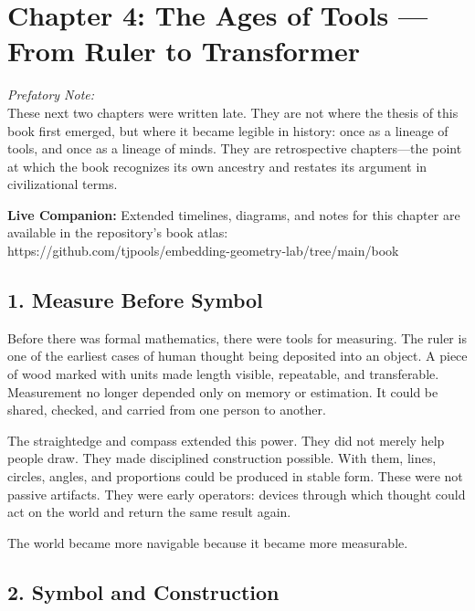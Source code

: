 \newpage
\vspace*{3cm}

\hypertarget{chapter-4-the-ages-of-tools-from-ruler-to-transformer}{%
\section{Chapter 4: The Ages of Tools --- From Ruler to
Transformer}\label{chapter-4-the-ages-of-tools-from-ruler-to-transformer}}

\emph{Prefatory Note:}\\
These next two chapters were written late. They are not where the thesis
of this book first emerged, but where it became legible in history: once
as a lineage of tools, and once as a lineage of minds. They are
retrospective chapters---the point at which the book recognizes its own
ancestry and restates its argument in civilizational terms.

\textbf{Live Companion:} Extended timelines, diagrams, and notes for
this chapter are available in the repository's book atlas:\\
https://github.com/tjpools/embedding-geometry-lab/tree/main/book

\hypertarget{measure-before-symbol}{%
\subsection{1. Measure Before Symbol}\label{measure-before-symbol}}

Before there was formal mathematics, there were tools for measuring. The
ruler is one of the earliest cases of human thought being deposited into
an object. A piece of wood marked with units made length visible,
repeatable, and transferable. Measurement no longer depended only on
memory or estimation. It could be shared, checked, and carried from one
person to another.

The straightedge and compass extended this power. They did not merely
help people draw. They made disciplined construction possible. With
them, lines, circles, angles, and proportions could be produced in
stable form. These were not passive artifacts. They were early
operators: devices through which thought could act on the world and
return the same result again.

The world became more navigable because it became more measurable.

\hypertarget{symbol-and-construction}{%
\subsection{2. Symbol and Construction}\label{symbol-and-construction}}

